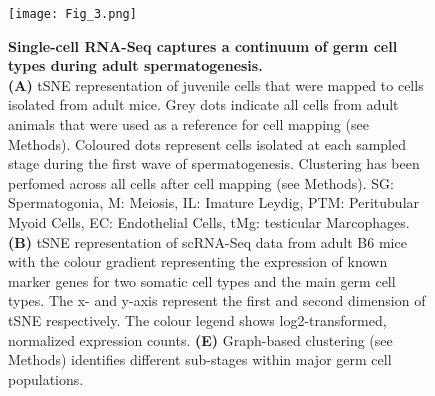 \begin{figure}[!h]
\centering
\texttt{[image: Fig\_3.png]}
\caption[Droplet based scRNAseq of mouse spermatogenesis]{\textbf{Single-cell RNA-Seq captures a continuum of germ cell types during adult spermatogenesis.}\\
\textbf{(A)} tSNE representation of juvenile cells that were mapped to cells isolated from adult mice. Grey dots indicate all cells from adult animals that were used as a reference for cell mapping (see Methods). Coloured dots represent cells isolated at each sampled stage during the first wave of spermatogenesis. Clustering has been perfomed across all cells after cell mapping (see Methods). SG: Spermatogonia, M: Meiosis, IL: Imature Leydig, PTM: Peritubular Myoid Cells, EC: Endothelial Cells, tMg: testicular Marcophages. \textbf{(B)} tSNE representation of scRNA-Seq data from adult B6 mice with the colour gradient representing the expression of known marker genes for two somatic cell types and the main germ cell types. The x- and y-axis represent the first and second dimension of tSNE respectively. The colour legend shows log2-transformed, normalized expression counts. \textbf{(E)} Graph-based clustering (see Methods) identifies different sub-stages within major germ cell populations. 
}
\label{fig3:cell_types}
\end{figure}



